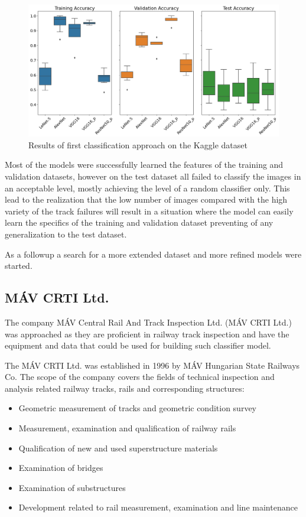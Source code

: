\begin{figure}[!ht]
    \centering
    \includegraphics[width=\textwidth]{./tex_images/bootstrap_results.png}
    \caption{Results of first classification approach on the Kaggle dataset}
    \label{fig:Kaggle_results}
\end{figure}

Most of the models were successfully learned the features of the training and validation datasets,
however on the test dataset all failed to classify the images in an acceptable level, mostly
achieving the level of a random classifier only.
This lead to the realization that the low number of images compared with the high variety of the track
failures will result in a situation where the model can easily learn the specifics of the training and
validation dataset preventing of any generalization to the test dataset.

As a followup a search for a more extended dataset and more refined models were started.

\subsection{MÁV CRTI Ltd.}

The company MÁV Central Rail And Track Inspection Ltd. (MÁV CRTI Ltd.) \cite{_mav_} was approached
as they are proficient in railway track inspection and have the equipment and data that could be used
for building such classifier model.

The MÁV CRTI Ltd. was established in 1996 by MÁV Hungarian State Railways Co.
The scope of the company covers the fields of technical inspection and analysis related
railway tracks, rails and corresponding structures:
\begin{itemize}
    \item Geometric measurement of tracks and geometric condition survey
    \item Measurement, examination and qualification of railway rails
    \item Qualification of new and used superstructure materials
    \item Examination of bridges
    \item Examination of substructures
    \item Development related to rail measurement, examination and line maintenance
\end{itemize}

